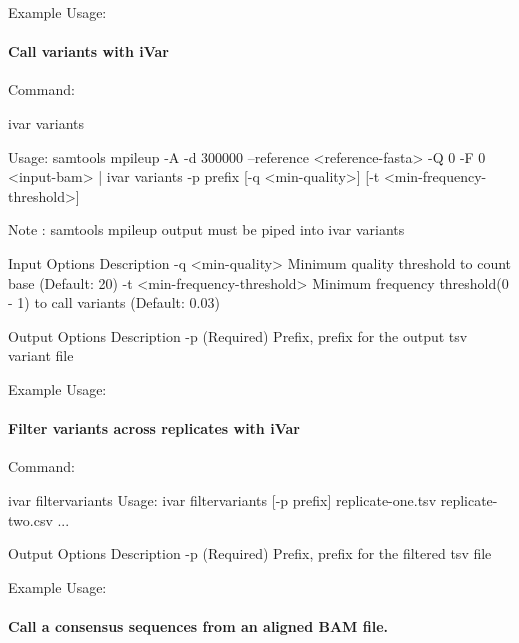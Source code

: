 Example Usage\+: 
\begin{DoxyCode}
\end{DoxyCode}


\paragraph*{Call variants with i\+Var}

Command\+: 
\begin{DoxyCode}
ivar variants

Usage: samtools mpileup -A -d 300000 --reference <reference-fasta> -Q 0 -F 0 <input-bam> | ivar variants -p
       prefix [-q <min-quality>] [-t <min-frequency-threshold>]

Note : samtools mpileup output must be piped into ivar variants

Input Options    Description
           -q    <min-quality> Minimum quality threshold to count base (Default: 20)
           -t    <min-frequency-threshold> Minimum frequency threshold(0 - 1) to call variants (Default:
       0.03)

Output Options   Description
           -p    (Required) Prefix, prefix for the output tsv variant file
\end{DoxyCode}


Example Usage\+: 
\begin{DoxyCode}
\end{DoxyCode}


\paragraph*{Filter variants across replicates with i\+Var}

Command\+: 
\begin{DoxyCode}
ivar filtervariants
Usage: ivar filtervariants [-p prefix] replicate-one.tsv replicate-two.csv ...

Output Options   Description
           -p    (Required) Prefix, prefix for the filtered tsv file
\end{DoxyCode}


Example Usage\+: 
\begin{DoxyCode}
\end{DoxyCode}


\paragraph*{Call a consensus sequences from an aligned B\+AM file.}

